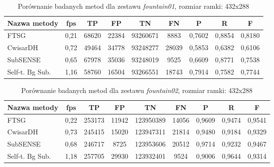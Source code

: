 \begin{table}[!h]
\small
\caption{Porównanie badanych metod dla zestawu \textit{fountain01}, rozmiar ramki: 432x288}
\label{tab:resultsFountain01}
\centering
\begin{tabular*}{\textwidth}{@{\extracolsep{\fill}} |l*{8}{|c}|}
  \hline 
  \textbf{Nazwa metody} & \textbf{fps} & \textbf{TP} & \textbf{FP} & \textbf{TN} & \textbf{FN} & \textbf{P} & \textbf{R} & \textbf{F}\\
  \hline
  FTSG & 0,21 & 68620 & 22384 & 93260671 & 8883 & 0,7602 & 0,8854 & 0,8180\\ 
\hline
CwisarDH & 0,72 & 49464 & 34778 & 93248277 & 28039 & 0,5853 & 0,6382 & 0,6106\\ 
\hline
SubSENSE & 0,65 & 67978 & 35036 & 93248019 & 9525 & 0,6609 & 0,8771 & 0,7538\\ 
\hline
Self-t. Bg Sub. & 1,16 & 58760 & 16504 & 93266551 & 18743 & 0,7914 & 0,7582 & 0,7744\\ 
\hline
\end{tabular*}
\end{table}

\begin{table}[!h]
\small
\caption{Porównanie badanych metod dla zestawu \textit{fountain02}, rozmiar ramki: 432x288}
\label{tab:resultsFountain02}
\centering
\begin{tabular*}{\textwidth}{@{\extracolsep{\fill}} |l*{8}{|c}|}
  \hline 
  \textbf{Nazwa metody} & \textbf{fps} & \textbf{TP} & \textbf{FP} & \textbf{TN} & \textbf{FN} & \textbf{P} & \textbf{R} & \textbf{F}\\
  \hline
  FTSG & 0,22 & 253173 & 11942 & 123950389 & 14056 & 0,9609 & 0,9474 & 0,9541\\ 
\hline
  CwisarDH & 0,73 & 245415 & 15020 & 123947311 & 21814 & 0,9480 & 0,9184 & 0,9329\\ 
\hline
  SubSENSE & 0,68 & 246717 & 8725 & 123953606 & 20512 & 0,9714 & 0,9232 & 0,9467\\ 
\hline
  Self-t. Bg Sub. & 1,18 & 257705 & 29930 & 123932401 & 9524 & 0,9006 & 0,9644 & 0,9314\\ 
\hline
\end{tabular*}
\end{table}

